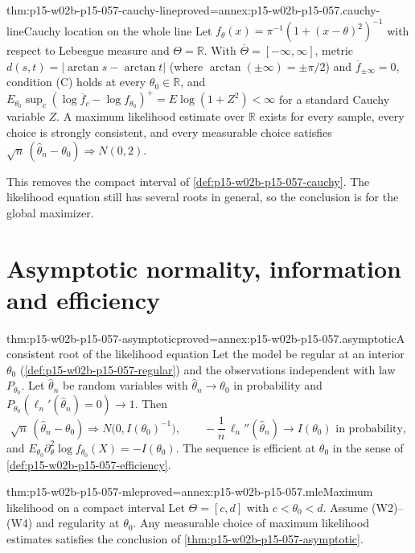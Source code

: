 \begin{hbtheorem}{thm:p15-w02b-p15-057-cauchy-line}{proved=annex:p15-w02b-p15-057.cauchy-line}{Cauchy location on the whole line}
Let \(f_\theta(x)=\pi^{-1}(1+(x-\theta)^2)^{-1}\) with respect to Lebesgue
measure and \(\Theta=\mathbb R\). With
\(\overline\Theta=[-\infty,\infty]\), metric
\(d(s,t)=|\arctan s-\arctan t|\) (where \(\arctan(\pm\infty)=\pm\pi/2\)) and
\(\overline f_{\pm\infty}=0\), condition (C) holds at every
\(\theta_0\in\mathbb R\), and
\(E_{\theta_0}\sup_c(\log\overline f_c-\log f_{\theta_0})^+
=E\log(1+Z^2)<\infty\) for a standard Cauchy variable \(Z\). A maximum
likelihood estimate over \(\mathbb R\) exists for every sample, every
choice is strongly consistent, and every measurable choice satisfies
\(\sqrt n\,(\widehat\theta_n-\theta_0)\Rightarrow N(0,2)\).
\end{hbtheorem}

This removes the compact interval of \cref{def:p15-w02b-p15-057-cauchy}.
The likelihood equation still has several roots in general, so the
conclusion is for the global maximizer.

\section{Asymptotic normality, information and efficiency}
\label{sec:p15-w02b-p15-057-asymptotic}

\begin{hbtheorem}{thm:p15-w02b-p15-057-asymptotic}{proved=annex:p15-w02b-p15-057.asymptotic}{A consistent root of the likelihood equation}
Let the model be regular at an interior \(\theta_0\)
(\cref{def:p15-w02b-p15-057-regular}) and the observations independent
with law \(P_{\theta_0}\). Let \(\widehat\theta_n\) be random variables
with \(\widehat\theta_n\to\theta_0\) in probability and
\(P_{\theta_0}(\ell_n'(\widehat\theta_n)=0)\to1\). Then
\[
 \sqrt n\,(\widehat\theta_n-\theta_0)\Rightarrow
 N\bigl(0,I(\theta_0)^{-1}\bigr),\qquad
 -\frac1n\,\ell_n''(\widehat\theta_n)\to I(\theta_0)
 \text{ in probability},
\]
and \(E_{\theta_0}\partial_\theta^2\log f_{\theta_0}(X)=-I(\theta_0)\).
The sequence is efficient at \(\theta_0\) in the sense of
\cref{def:p15-w02b-p15-057-efficiency}.
\end{hbtheorem}

\begin{hbcorollary}{thm:p15-w02b-p15-057-mle}{proved=annex:p15-w02b-p15-057.mle}{Maximum likelihood on a compact interval}
Let \(\Theta=[c,d]\) with \(c<\theta_0<d\). Assume (W2)--(W4) and
regularity at \(\theta_0\). Any measurable choice of maximum likelihood
estimates satisfies the conclusion of
\cref{thm:p15-w02b-p15-057-asymptotic}.
\end{hbcorollary}


